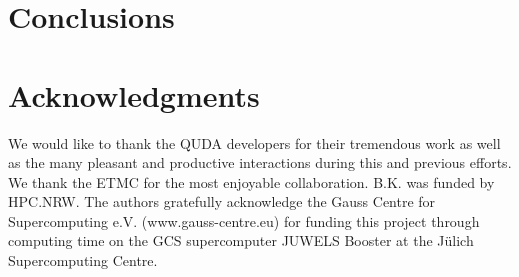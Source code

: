 \documentclass[a0,portrait]{a0poster}
\begin{document}
\begin{multicols}{2}
    \section*{Conclusions}
    \color{Black} %


    \section*{Acknowledgments}

    We would like to thank the QUDA developers for their tremendous work as well as the many pleasant and productive
    interactions during this and previous efforts. We thank the ETMC for the most enjoyable collaboration. B.K. was funded
    by HPC.NRW.
    The authors gratefully acknowledge the Gauss Centre for Supercomputing e.V.
    (www.gauss-centre.eu) for funding this project through computing time on the GCS supercomputer JUWELS Booster
    at the Jülich Supercomputing Centre.



\end{multicols}
\end{document}
